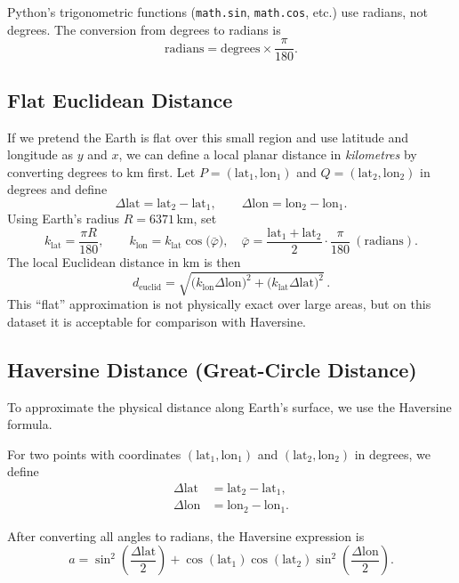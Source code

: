 \documentclass[11pt]{article}
\begin{document}
Python's trigonometric functions (\texttt{math.sin}, \texttt{math.cos}, etc.) use radians, not degrees. The conversion from degrees to radians is
\[
\text{radians} = \text{degrees} \times \frac{\pi}{180}.
\]

%

\subsection{Flat Euclidean Distance}
If we pretend the Earth is flat over this small region and use latitude and longitude as $y$ and $x$, we can define a local planar distance in \emph{kilometres} by converting degrees to km first. Let $P=(\text{lat}_1,\text{lon}_1)$ and $Q=(\text{lat}_2,\text{lon}_2)$ in degrees and define
\[
  \Delta \text{lat} = \text{lat}_2 - \text{lat}_1,\qquad
  \Delta \text{lon} = \text{lon}_2 - \text{lon}_1.
\]
Using Earth's radius $R=6371\,$km, set
\[
  k_{\text{lat}} = \frac{\pi R}{180},\qquad
  k_{\text{lon}} = k_{\text{lat}} \cos\!\bigl(\bar{\varphi}\bigr),\quad
  \bar{\varphi} = \frac{\text{lat}_1+\text{lat}_2}{2}\cdot\frac{\pi}{180} \ (\text{radians}).
\]
The local Euclidean distance in km is then
\[
  d_{\text{euclid}} = \sqrt{\bigl(k_{\text{lon}}\Delta \text{lon}\bigr)^2 + \bigl(k_{\text{lat}}\Delta \text{lat}\bigr)^2}\,.
\]
This ``flat'' approximation is not physically exact over large areas, but on this dataset it is acceptable for comparison with Haversine.

\subsection{Haversine Distance (Great-Circle Distance)}
To approximate the physical distance along Earth's surface, we use the Haversine formula.

For two points with coordinates $(\text{lat}_1, \text{lon}_1)$ and $(\text{lat}_2, \text{lon}_2)$ in degrees, we define
\begin{align*}
\Delta \text{lat} &= \text{lat}_2 - \text{lat}_1,\\
\Delta \text{lon} &= \text{lon}_2 - \text{lon}_1.
\end{align*}

After converting all angles to radians, the Haversine expression is
\[
 a = \sin^2\left(\frac{\Delta \text{lat}}{2}\right)
     + \cos(\text{lat}_1)\cos(\text{lat}_2)\sin^2\left(\frac{\Delta \text{lon}}{2}\right).
\]
\end{document}

